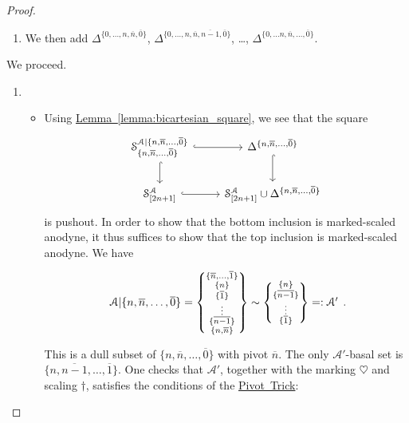 \documentclass[main.tex]{subfiles}
\begin{document}
\begin{proof}
\begin{enumerate}
    \item We then add $\Delta^{\{0, \ldots, n, \overline{n}, \overline{0}\}}$, $\Delta^{\{0, \ldots, n, \overline{n}, \overline{n-1}, \overline{0}\}}$, \dots, $\Delta^{\{0, \ldots n, \overline{n}, \ldots, \overline{0}\}}$.
  \end{enumerate}
  We proceed.
  \begin{enumerate}
    \item 
      \begin{itemize}
        \item Using \hyperref[lemma:bicartesian_square]{Lemma~\ref*{lemma:bicartesian_square}}, we see that the square
          \begin{equation*}
            \begin{tikzcd}
              \S^{\mathcal{A}|\{n, \overline{n}, \ldots, \overline{0}\}}_{\{n, \overline{n}, \ldots, \overline{0}\}}
              \arrow[r, hook]
              \arrow[d, hook]
              & \Delta^{\{n, \overline{n}, \ldots, \overline{0}\}}
              \arrow[d, hook]
              \\
              \S^{\mathcal{A}}_{[2n+1]}
              \arrow[r, hook]
              & \S^{\mathcal{A}}_{[2n+1]} \cup \Delta^{\{n, \overline{n}, \ldots, \overline{0}\}}
            \end{tikzcd}
          \end{equation*}
          is pushout. In order to show that the bottom inclusion is marked-scaled anodyne, it thus suffices to show that the top inclusion is marked-scaled anodyne. We have
          \begin{equation*}
            \begin{tikzcd}
              \mathcal{A}|\{n, \overline{n}, \ldots, \overline{0}\} 
              = \left\{ \substack{ \{\overline{n}, \ldots, \overline{1}\} \\ \{n\} \\ \{\overline{1}\} \\ \vdots \\ \{\overline{n-1}\} \\ \{n, \overline{n}\} } \right\}
              \sim \left\{ \substack{ \{n\} \\ \{\overline{n-1}\} \\ \vdots \\ \{\overline{1}\} } \right\} =: \mathcal{A}'
            \end{tikzcd}.
          \end{equation*}
          This is a dull subset of $\{n, \overline{n}, \ldots, \overline{0}\}$ with pivot $\overline{n}$. The only $\mathcal{A}'$-basal set is $\{n, \overline{n-1}, \ldots, \overline{1}\}$. One checks that $\mathcal{A}'$, together with the marking $\heartsuit$ and scaling $\dagger$, satisfies the conditions of the \hyperref[lemma:pivot_trick]{Pivot~Trick}:

\end{itemize}
\end{enumerate}
\end{proof}
\end{document}
